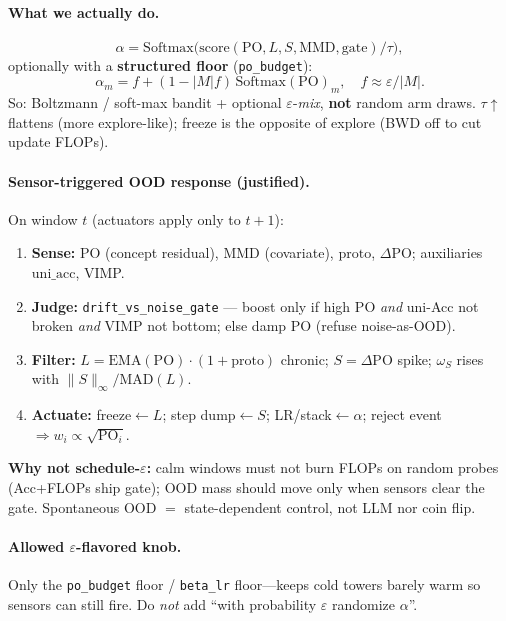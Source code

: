 \documentclass[11pt]{article}
\newcommand{\PO}{\mathrm{PO}}
\begin{document}
\paragraph{What we actually do.}
\[
\alpha=\mathrm{Softmax}\big(\mathrm{score}(\PO,L,S,\mathrm{MMD},\mathrm{gate})/\tau\big),
\]
optionally with a \textbf{structured floor} (\texttt{po\_budget}):
\[
\alpha_m=f+(1-|M|f)\,\mathrm{Softmax}(\PO)_m,
\quad f\approx\varepsilon/|M|.
\]
So: Boltzmann / soft-max bandit + optional $\varepsilon$-\emph{mix},
\textbf{not} random arm draws.
$\tau\!\uparrow$ flattens (more explore-like); freeze is the opposite of
explore (BWD off to cut update FLOPs).

\paragraph{Sensor-triggered OOD response (justified).}
On window $t$ (actuators apply only to $t{+}1$):
\begin{enumerate}[leftmargin=1.2em,itemsep=1pt]
  \item \textbf{Sense:} $\PO$ (concept residual), $\mathrm{MMD}$ (covariate),
        $\mathrm{proto}$, $\Delta\PO$; auxiliaries $\mathrm{uni\_acc}$, VIMP.
  \item \textbf{Judge:} \texttt{drift\_vs\_noise\_gate} --- boost only if
        high $\PO$ \emph{and} uni-Acc not broken \emph{and} VIMP not bottom;
        else damp $\PO$ (refuse noise-as-OOD).
  \item \textbf{Filter:} $L=\mathrm{EMA}(\PO)\cdot(1+\mathrm{proto})$ chronic;
        $S=\Delta\PO$ spike; $\omega_S$ rises with
        $\|S\|_\infty/\mathrm{MAD}(L)$.
  \item \textbf{Actuate:} freeze$\leftarrow L$; step dump$\leftarrow S$;
        LR/stack$\leftarrow\alpha$; reject event$\Rightarrow w_i\propto\sqrt{\PO_i}$.
\end{enumerate}
\textbf{Why not schedule-$\varepsilon$:} calm windows must not burn FLOPs on
random probes (Acc+FLOPs ship gate); OOD mass should move only when sensors
clear the gate. Spontaneous OOD $=$ state-dependent control, not LLM nor
coin flip.

\paragraph{Allowed $\varepsilon$-flavored knob.}
Only the \texttt{po\_budget} floor / \texttt{beta\_lr} floor---keeps cold
towers barely warm so sensors can still fire. Do \emph{not} add
``with probability $\varepsilon$ randomize $\alpha$''.
\end{document}

